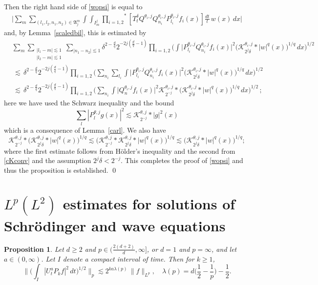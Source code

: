 \documentclass[11pt]{amsart}
\newtheorem{proposition}[theorem]{Proposition}
\theoremstyle{definition}
\numberwithin{theorem}{section}
\numberwithin{definition}{section}
\def\prodstar{{\prod_{i=1,2}}^{\!\!*}}
\newcommand{\note}[1]{\footnote{\texttt{\Small #1}}}
\def\lc{\lesssim}
\def\la{\lambda}             \def\La{\Lambda}
\def\fA{{\mathfrak {A}}}
\def\cK{{\mathcal {K}}}
\begin{document}
Then the right hand side of \eqref{wopsi} is equal to
\begin{align*}
\Big|\sum_m \sum_{(l_1,l_2,n_1,n_2)\in \fA_j^m}
\int\int_{I^j_m}\prodstar [T^\delta_t Q^{\theta_i,j} Q^{\theta_i,j}_{n_i} P^{\theta_i,j}_{l_i} f_i(x)]  \frac{dt}{t}\,w(x) \, dx\Big|
\end{align*}
 and, by Lemma~\ref{scaledbil}, this is  estimated by
\begin{align*}&\sum_m \sum_{\substack {|l_1-m|\lc 1\\|l_2-m|\lc 1}} \sum_{|n_1-n_2|\lc 1}\delta^{2-\frac{d}{q}}2^{-2j(\frac dq-1)}
\prod_{i=1,2}\Big(
\int\big| P^{\theta_i,j}_{l_i} Q^{\theta_i,j}_{n_i} f_i(x)\big|^2
\big(\cK^{\theta_i, j}_{2^j\delta} *|w|^q(x)\big)^{1/q}  \, dx\Big)^{1/2}
\\
&\,\lc\, 
\delta^{2-\frac{d}{q}}2^{-2j(\frac dq-1)}\prod_{i=1,2}\Big(\sum_{n_i}
\sum_{l_i}\int
\big| P^{\theta_i,j}_{l_i} Q^{\theta_i,j}_{n_i} f_i(x)\big|^2
\big(\cK^{\theta_i,j}_{2^j\delta} *|w|^q(x)\big)^{1/q}  \, dx\Big)^{1/2}
\\
&\,\lc\, 
\delta^{2-\frac{d}{q}}2^{-2j(\frac dq-1)}\prod_{i=1,2}\Big(\sum_{n_i}
\int\big| Q^{\theta_i,j}_n f_i(x)\big|^2
\cK^{\theta_i,j}_{2^{-j}}*\big(\cK^{\theta_i,j}_{2^j\delta} *|w|^q(x)
\big)^{1/q}
\, dx\Big)^{1/2}\,;
\end{align*}
here we have used the  Schwarz inequality  and the bound
$$\sum_l| P^{\theta,j}_l g(x)|^2 \lc  \cK^{\theta, j}_{2^{-j}}* |g|^2(x) $$
which is a consequence of Lemma~\ref{carl}.
We also have
$$\cK^{\theta, j}_{2^{-j}}*
\big(\cK^{\theta, j}_{2^j\delta} *|w|^q(x)\big)^{1/q}
\lc \big(\cK^{\theta, j}_{2^{-j}}*
\cK^{\theta, j}_{2^j\delta} *|w|^q(x)\big)^{1/q}
\lc \big(\cK^{\theta, j}_{2^j\delta} *|w|^q(x)\big)^{1/q} ;
$$
where the first estimate  follows from H\"older's inequality and the
second from \eqref{cKconv} and the assumption  $2^j\delta<2^{-j}$.
This completes the proof of \eqref{wopsi} and thus the proposition is established.
\qed




\section{$L^p(L^2)$ estimates for solutions of Schr\"odinger and wave equations}
\label{wschrsect}
\begin{proposition}\label{wavefrloc}
Let $d\ge 2$ and  $p\in(\frac{2(d+2)}{d},\infty]$, or $d=1$ and $p=\infty$, and let $a\in(0,\infty)$.
Let $I$ denote a compact interval of time. Then for $k\ge 1$,
\begin{equation}\label{psaloc}
\Big\|\Big(\int_I|U^a_t P_kf|^2 \,dt\Big)^{1/2}\Big\|_{p}
\lc 2^{k a \la(p)}\, \|f\|_{L^p},\quad \la(p)=d\Big(\frac 12-\frac 1p\Big)-\frac 12.
\end{equation}
\end{proposition}
\end{document}
